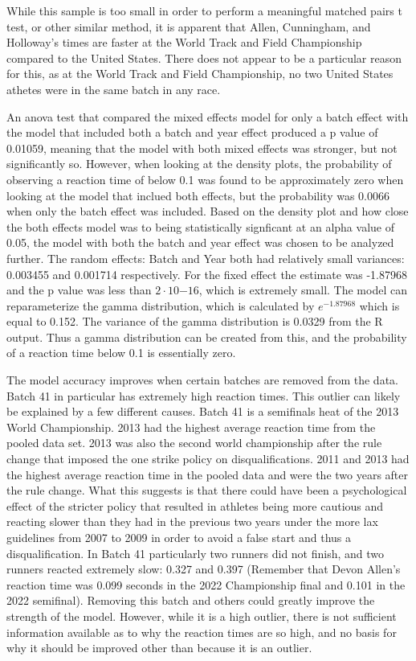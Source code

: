 \documentclass[12pt, letterpaper, titlepage]{article}
\begin{document}
While this sample is too small in order
to perform a meaningful matched pairs t test, or other similar method, it is apparent
that Allen, Cunningham, and Holloway's times are faster at the World Track and Field
Championship compared to the United States.  There does not appear to be a particular
reason for this, as at the World Track and Field Championship, no two United States
athetes were in the same batch in any race.

An anova test that compared the mixed effects model for only a batch effect with the
model that included both a batch and year effect produced a p value of 0.01059, meaning
that the model with both mixed effects was stronger, but not significantly so.  However,
when looking at the density plots, the probability of observing a reaction time of below
0.1 was found to be approximately zero when looking at the model that inclued both effects,
but the probability was 0.0066 when only the batch effect was included.  Based on the density
plot and how close the both effects model was to being statistically signficant at an alpha
value of 0.05, the model with both the batch and year effect was chosen to be analyzed further.
The random effects: Batch and Year both had relatively small variances: 0.003455 and 0.001714
respectively.  For the fixed effect the estimate was -1.87968 and the p value was less than
$2\cdot10{-16}$, which is extremely small.  The model can reparameterize the gamma distribution,
which is calculated by $e^{-1.87968}$ which is equal to 0.152.  The variance of the gamma
distribution is 0.0329 from the R output.  Thus a gamma distribution can be created from
this, and the probability of a reaction time below 0.1 is essentially zero.  

The model accuracy improves when certain batches are removed from the data.  Batch 41 in
particular has extremely high reaction times.  This outlier can likely be explained by a
few different causes.  Batch 41 is a semifinals heat of the 2013 World Championship.  2013 had the highest average reaction time from the pooled data set.  2013 was also the second world championship after the rule change that imposed the one strike policy on
disqualifications. 2011 and 2013 had the highest average reaction time in the pooled
data and were the two years after the rule change.  What this suggests is that there could have been a psychological effect of the stricter policy that resulted in athletes being more cautious and reacting slower than they had in the previous two years under the more lax guidelines from 2007 to 2009 in order to avoid a false start and thus a disqualification.
In Batch 41 particularly two runners did not finish, and two runners reacted extremely slow: 0.327 and 0.397 (Remember that Devon Allen's reaction time was
0.099 seconds in the 2022 Championship final and 0.101 in the 2022 semifinal).  Removing this batch and others could greatly improve the strength of the model.  However, while
it is a high outlier, there is not sufficient information available as to why the
reaction times are so high, and no basis for why it should be improved other than because
it is an outlier.
\end{document}
